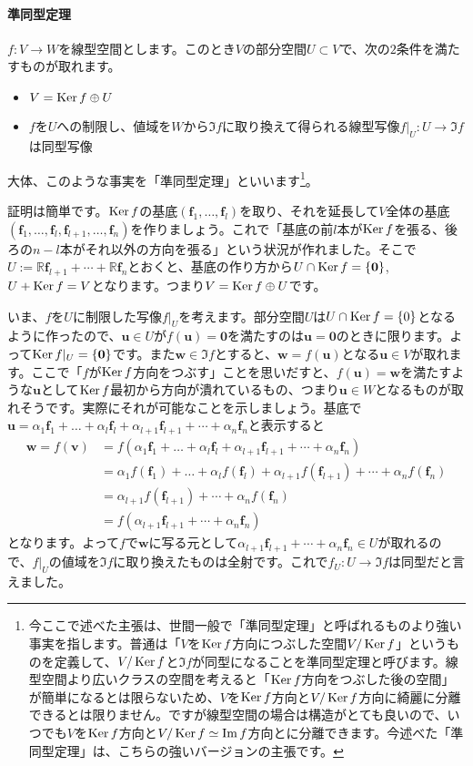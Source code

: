 \paragraph{準同型定理} $f\colon V\rightarrow W$を線型空間とします。このとき$V$の部分空間$U \subset V$で、次の$2$条件を満たすものが取れます。
\begin{itemize}
\item $V = \operatorname{Ker} f \oplus U$
\item $f$を$U$への制限し、値域を$W$から$\Im f$に取り換えて得られる線型写像$f|_{U} \colon U\rightarrow \Im f$は同型写像
\end{itemize}
大体、このような事実を「準同型定理」といいます\footnote{今ここで述べた主張は、世間一般で「準同型定理」と呼ばれるものより強い事実を指します。普通は「$V$を$\operatorname{Ker} f$方向につぶした空間$V/\operatorname{Ker} f$」というものを定義して、$V/\operatorname{Ker} f$と$\Im f$が同型になることを準同型定理と呼びます。線型空間より広いクラスの空間を考えると「$\operatorname{Ker} f$方向をつぶした後の空間」が簡単になるとは限らないため、$V$を$\operatorname{Ker} f$方向と$V/\operatorname{Ker} f$方向に綺麗に分離できるとは限りません。ですが線型空間の場合は構造がとても良いので、いつでも$V$を$\operatorname{Ker} f$方向と$V/\operatorname{Ker} f \simeq \mathrm{Im}\, f$方向とに分離できます。今述べた「準同型定理」は、こちらの強いバージョンの主張です。}。

証明は簡単です。$\operatorname{Ker} f$の基底$(\bm{f}_1, \ldots, \bm{f}_l)$を取り、それを延長して$V$全体の基底$(\bm{f}_1, \ldots, \bm{f}_l, \bm{f}_{l + 1}, \ldots, \bm{f}_n)$を作りましょう。これで「基底の前$l$本が$\operatorname{Ker} f$を張る、後ろの$n - l$本がそれ以外の方向を張る」という状況が作れました。そこで$U := \mathbb{R}\bm{f}_{l + 1} + \cdots + \mathbb{R}\bm{f}_n$とおくと、基底の作り方から$U \cap \operatorname{Ker} f = \{\boldsymbol{0}\}$, $U + \operatorname{Ker} f = V$となります。つまり$V = \operatorname{Ker} f \oplus U$です。

いま、$f$を$U$に制限した写像$f|_U$を考えます。部分空間$U$は$U\cap \operatorname{Ker} f = \{0\}$となるように作ったので、$\bm{u} \in U$が$f(\bm{u}) = \bm{0}$を満たすのは$\bm{u} = \bm{0}$のときに限ります。よって$\operatorname{Ker} f|_U = \{\boldsymbol{0}\}$です。また$\bm{w} \in \Im f$とすると、$\bm{w} = f(\bm{u})$となる$\bm{u} \in V$が取れます。ここで「$f$が$\operatorname{Ker} f$方向をつぶす」ことを思いだすと、$f(\bm{u}) = \bm{w}$を満たすような$\bm{u}$として$\operatorname{Ker} f$最初から方向が潰れているもの、つまり$\bm{u} \in W$となるものが取れそうです。実際にそれが可能なことを示しましょう。基底で$\bm{u} = \alpha_1 \bm{f}_1 + \ldots + \alpha_l \bm{f}_l + \alpha_{l + 1} \bm{f}_{l + 1} + \cdots + \alpha_{n} \bm{f}_n$と表示すると
\begin{align*}
\bm{w} = f(\bm{v}) &= f(\alpha_1 \bm{f}_1 + \ldots + \alpha_l \bm{f}_l + \alpha_{l + 1} \bm{f}_{l + 1} + \cdots + \alpha_{n} \bm{f}_n) \\
&= \alpha_1 f(\bm{f}_1) + \ldots + \alpha_l f(\bm{f}_l) + \alpha_{l + 1} f(\bm{f}_{l + 1}) + \cdots + \alpha_{n} f(\bm{f}_n) \\
&= \alpha_{l + 1} f(\bm{f}_{l + 1}) + \cdots + \alpha_{n} f(\bm{f}_n) \\
&= f(\alpha_{l + 1} \bm{f}_{l + 1} + \cdots + \alpha_{n} \bm{f}_n)
\end{align*}
となります。よって$f$で$\bm{w}$に写る元として$\alpha_{l + 1} \bm{f}_{l + 1} + \cdots + \alpha_{n} \bm{f}_n \in U$が取れるので、$f|_U$の値域を$\Im f$に取り換えたものは全射です。これで$f_U\colon U \rightarrow \Im f$は同型だと言えました。

